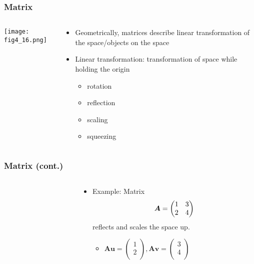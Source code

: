 \documentclass[pdflatex, 12pt]{beamer}
\begin{document}
\begin{frame}
\frametitle{Matrix}
\begin{columns}
\begin{column}{0.5\textwidth}
\centering
\texttt{[image: fig4\_16.png]}
\end{column}
\begin{column}{0.5\textwidth}
\begin{itemize}
\item Geometrically, matrices describe linear transformation of the space/objects on the space
\vspace{0.4cm}
\item Linear transformation: transformation of space while holding the origin 
 \begin{itemize}
 \item rotation
 \item reflection
 \item scaling
 \item squeezing
 \end{itemize}
\end{itemize}
\end{column}
\end{columns}
\end{frame}

\begin{frame}
\frametitle{Matrix (cont.)}
\begin{columns}
\begin{column}{0.5\textwidth}
\centering
{}
\end{column}
\begin{column}{0.5\textwidth}
\begin{itemize}
\item Example: Matrix 
 \begin{equation}
 \bm{A} = \begin{pmatrix}
 1 & 3 \\
 2 & 4 \\
 \end{pmatrix} \notag
 \end{equation}
reflects and scales the space up.
 \begin{itemize}
 \item $\bm{Au} = \begin{pmatrix}
 1 \\
 2 \\
 \end{pmatrix}, \bm{Av} = \begin{pmatrix}
 3 \\
 4 \\
 \end{pmatrix}$
 \end{itemize}
\end{itemize}
\end{column}
\end{columns}
\end{frame}
\end{document}
